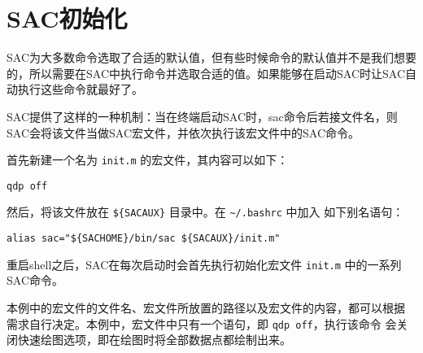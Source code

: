 \section{SAC初始化}
\label{sec:init-macro}
SAC为大多数命令选取了合适的默认值，但有些时候命令的默认值并不是我们想要的，所以需要在SAC中执行命令并选取合适的值。如果能够在启动SAC时让SAC自动执行这些命令就最好了。

SAC提供了这样的一种机制：当在终端启动SAC时，sac命令后若接文件名，则SAC会将该文件当做SAC宏文件，并依次执行该宏文件中的SAC命令。

首先新建一个名为 \texttt{init.m} 的宏文件，其内容可以如下：
\begin{verbatim}
qdp off
\end{verbatim}

然后，将该文件放在 \verb|${SACAUX}| 目录中。在 \verb|~/.bashrc| 中加入
如下别名语句：
\begin{verbatim}
alias sac="${SACHOME}/bin/sac ${SACAUX}/init.m"
\end{verbatim}

重启shell之后，SAC在每次启动时会首先执行初始化宏文件 \texttt{init.m} 中的一系列SAC命令。

本例中的宏文件的文件名、宏文件所放置的路径以及宏文件的内容，都可以根据
需求自行决定。本例中，宏文件中只有一个语句，即 \texttt{qdp off}，执行该命令
会关闭快速绘图选项，即在绘图时将全部数据点都绘制出来。